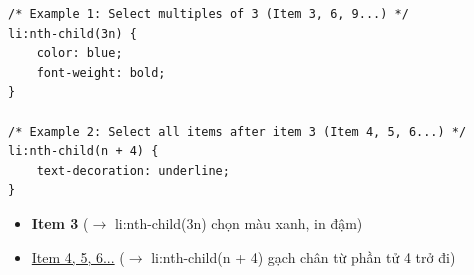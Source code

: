 \documentclass[11pt,oneside]{book}
\begin{document}
\begin{codeWindow}
\begin{lstlisting}[language=CSS3]
/* Example 1: Select multiples of 3 (Item 3, 6, 9...) */
li:nth-child(3n) {
    color: blue;
    font-weight: bold;
}

/* Example 2: Select all items after item 3 (Item 4, 5, 6...) */
li:nth-child(n + 4) {
    text-decoration: underline;
}
\end{lstlisting}
\end{codeWindow}

\begin{browserWindow}
\sffamily\small
\begin{itemize}[leftmargin=1.5em, itemsep=2pt, parsep=0pt]
    \item \textcolor{primaryBlue}{\textbf{Item 3}} {\scriptsize\textcolor{gray!60}{($\rightarrow$ li:nth-child(3n) chọn màu xanh, in đậm)}}
    \item \underline{Item 4, 5, 6...} {\scriptsize\textcolor{gray!60}{($\rightarrow$ li:nth-child(n + 4) gạch chân từ phần tử 4 trở đi)}}
\end{itemize}
\end{browserWindow}
\end{document}
